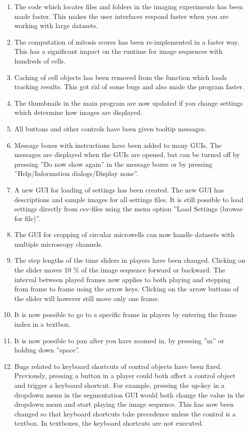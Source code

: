\documentclass[a4paper, oneside, onecolumn, 11pt]{article}
\begin{document}
\begin{enumerate}
  \item The code which locates files and folders in the imaging experiments has been made faster. This makes the user interfaces respond faster when you are working with large datasets.
  \item The computation of mitosis scores has been re-implemented in a faster way. This has a significant impact on the runtime for image sequences with hundreds of cells.
  \item Caching of cell objects has been removed from the function which loads tracking results. This got rid of some bugs and also made the program faster.
  \item The thumbnails in the main program are now updated if you change settings which determine how images are displayed.
  \item All buttons and other controls have been given tooltip messages.
  \item Message boxes with instructions have been added to many GUIs. The messages are displayed when the GUIs are opened, but can be turned off by pressing ''Do now show again'' in the message boxes or by pressing ''Help/Information dialogs/Display none''.
  \item A new GUI for loading of settings has been created. The new GUI has descriptions and sample images for all settings files. It is still possible to load settings directly from csv-files using the menu option ''Load Settings (browse for file)''.
  \item The GUI for cropping of circular microwells can now handle datasets with multiple microscopy channels.
  \item The step lengths of the time sliders in players have been changed. Clicking on the slider moves 10 \% of the image sequence forward or backward. The interval between played frames now applies to both playing and stepping from frame to frame using the arrow keys. Clicking on the arrow buttons of the slider will however still move only one frame.
  \item It is now possible to go to a specific frame in players by entering the frame index in a textbox.
  \item It is now possible to pan after you have zoomed in, by pressing ''m'' or holding down ''space''.
  \item Bugs related to keyboard shortcuts of control objects have been fixed. Previously, pressing a button in a player could both affect a control object and trigger a keyboard shortcut. For example, pressing the up-key in a dropdown menu in the segmentation GUI would both change the value in the dropdown menu and start playing the image sequence. This has now been changed so that keyboard shortcuts take precedence unless the control is a textbox. In textboxes, the keyboard shortcuts are not executed.

\end{enumerate}
\end{document}
